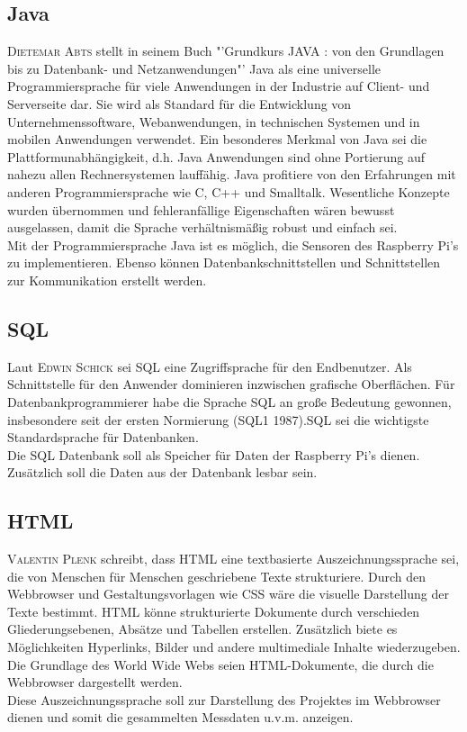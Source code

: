 \subsection{Java}\label{Java}
\textsc{Dietemar Abts} stellt in seinem Buch "'Grundkurs JAVA : von den Grundlagen bis zu Datenbank- und Netzanwendungen"' \cite{abts2015grundkurs} Java als eine universelle Programmiersprache für viele Anwendungen in der Industrie auf Client- und Serverseite dar.
Sie wird als Standard für die Entwicklung von Unternehmenssoftware, Webanwendungen, in technischen Systemen und in mobilen Anwendungen verwendet.
Ein besonderes Merkmal von Java sei die Plattformunabhängigkeit, d.h. Java Anwendungen sind ohne Portierung auf nahezu allen Rechnersystemen lauffähig. Java profitiere von den Erfahrungen mit anderen Programmiersprache wie C, C++ und Smalltalk. Wesentliche Konzepte wurden übernommen und fehleranfällige Eigenschaften wären bewusst ausgelassen, damit die Sprache verhältnismäßig robust und einfach sei.\\
Mit der Programmiersprache Java ist es möglich, die Sensoren des Raspberry Pi's zu implementieren. Ebenso können Datenbankschnittstellen und Schnittstellen zur Kommunikation erstellt werden.

\subsection{\ac{SQL}}
Laut \textsc{Edwin Schick}\cite{schicker2017datenbanken} sei \ac{SQL} eine Zugriffsprache für den Endbenutzer. Als Schnittstelle für den Anwender dominieren inzwischen grafische Oberflächen. Für Datenbankprogrammierer habe die Sprache \ac{SQL} an große Bedeutung gewonnen, insbesondere seit der ersten Normierung (SQL1 1987).\ac{SQL} sei die wichtigste Standardsprache für Datenbanken. \\
Die \ac{SQL} Datenbank soll als Speicher für Daten der Raspberry Pi's dienen. Zusätzlich soll die Daten aus der Datenbank lesbar sein.
\subsection{\ac{HTML}}
\textsc{Valentin Plenk}\cite{plenk2017angewandte} schreibt, dass \ac{HTML} eine textbasierte Auszeichnungssprache sei, die von Menschen für Menschen geschriebene Texte strukturiere. Durch den Webbrowser und Gestaltungsvorlagen wie \ac{CSS} wäre die visuelle Darstellung der Texte bestimmt. \ac{HTML} könne strukturierte Dokumente durch verschieden Gliederungsebenen, Absätze und Tabellen erstellen. Zusätzlich biete es Möglichkeiten Hyperlinks, Bilder und andere multimediale Inhalte wiederzugeben. Die Grundlage des World Wide Webs seien \ac{HTML}-Dokumente, die durch die Webbrowser dargestellt werden. \\
Diese Auszeichnungssprache soll zur Darstellung des Projektes im Webbrowser dienen und somit die gesammelten Messdaten u.v.m. anzeigen.

